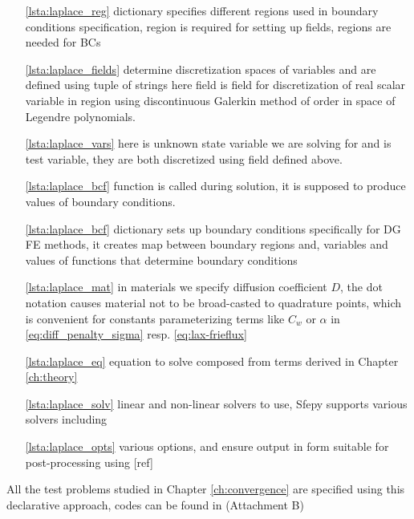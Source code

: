\begin{itemize}
	\item[\ref{lsta:laplace_reg}]  dictionary specifies different 
	regions 
	used in	boundary conditions specification,  region is required for 
	setting up fields,  regions are needed for BCs
	\item[\ref{lsta:laplace_fields}]   determine discretization spaces of 
	variables and are defined using tuple of strings
	 here field  is field for discretization of real scalar 
	variable in region  using discontinuous Galerkin method of order 
	 in space of Legendre polynomials. 
	\item[\ref{lsta:laplace_vars}]  here  is unknown state variable we are 
	solving for and  is test variable, they are both discretized using field 
	 defined above.
	\item[\ref{lsta:laplace_bcf}]  function  is called during solution, it 
	is supposed to produce values of boundary conditions.
	\item[\ref{lsta:laplace_bcf}]  dictionary sets up boundary 
	conditions specifically for DG FE methods, it creates map between boundary regions 
	and, variables and values of functions that determine boundary conditions
	\item[\ref{lsta:laplace_mat}] in materials we specify diffusion 
	coefficient $D$, the dot notation  
	causes material not to be broad-casted to quadrature points, which is convenient for 
	constants parameterizing terms like $C_w$ or $\alpha$ in 
	\eqref{eq:diff_penalty_sigma} 
	resp. \eqref{eq:lax-frieflux}
	\item[\ref{lsta:laplace_eq}] equation to solve composed from terms derived in 
	Chapter \ref{ch:theory}
	
	\item[\ref{lsta:laplace_solv}] linear and non-linear solvers to use, Sfepy supports 
	various solvers including  \cite{MUMPS:2}
	
	\item[\ref{lsta:laplace_opts}] various options,  and 
	 ensure output in form suitable for 
	post-processing 
	using 
	 [\todo ref] %
\end{itemize}
All the test problems studied in Chapter \ref{ch:convergence} are specified using this 
declarative approach, codes can be found in (\todo Attachment B)

